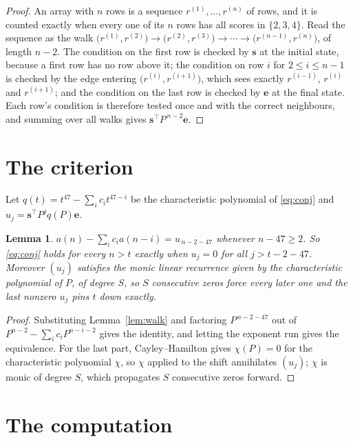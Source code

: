 \documentclass[11pt,a4paper]{article}
\theoremstyle{plain}
\newtheorem{lemma}[theorem]{Lemma}
\theoremstyle{definition}
\begin{document}
\begin{proof}
An array with $n$ rows is a sequence $r^{(1)},\dots,r^{(n)}$ of rows, and it is counted
exactly when every one of its $n$ rows has all scores in $\{2,3,4\}$. Read the sequence as the
walk $\bigl(r^{(1)},r^{(2)}\bigr)\to\bigl(r^{(2)},r^{(3)}\bigr)\to\cdots\to
\bigl(r^{(n-1)},r^{(n)}\bigr)$, of length $n-2$. The condition on the first row is
checked by $\mathbf{s}$ at the initial state, because a first row has no row above it; the
condition on row $i$ for $2\le i\le n-1$ is checked by the edge entering
$\bigl(r^{(i)},r^{(i+1)}\bigr)$, which sees exactly $r^{(i-1)}$, $r^{(i)}$ and
$r^{(i+1)}$; and the condition on the last row is checked by $\mathbf{e}$ at the final
state. Each row's condition is therefore tested once and with the correct neighbours, and
summing over all walks gives $\mathbf{s}^{\!\top}P^{\,n-2}\mathbf{e}$.
\end{proof}

\section{The criterion}

Let $q(t)=t^{47}-\sum_i c_i t^{47-i}$ be the characteristic polynomial of
\eqref{eq:conj} and $u_j=\mathbf{s}^{\!\top}P^{j}q(P)\mathbf{e}$.

\begin{lemma}\label{lem:crit}
$a(n)-\sum_i c_i a(n-i)=u_{\,n-2-47}$ whenever $n-47\ge2$. So \eqref{eq:conj}
holds for every $n>t$ exactly when $u_j=0$ for all $j>t-2-47$. Moreover $(u_j)$
satisfies the monic linear recurrence given by the characteristic polynomial of $P$, of
degree $S$, so $S$ consecutive zeros force every later one and the last nonzero $u_j$ pins
$t$ down exactly.
\end{lemma}

\begin{proof}
Substituting Lemma~\ref{lem:walk} and factoring $P^{\,n-2-47}$ out of
$P^{n-2}-\sum_i c_i P^{n-i-2}$ gives the identity, and letting the exponent run gives the
equivalence. For the last part, Cayley--Hamilton gives $\chi(P)=0$ for the characteristic
polynomial $\chi$, so $\chi$ applied to the shift annihilates $(u_j)$; $\chi$ is monic of
degree $S$, which propagates $S$ consecutive zeros forward.
\end{proof}

\section{The computation}
\end{document}
